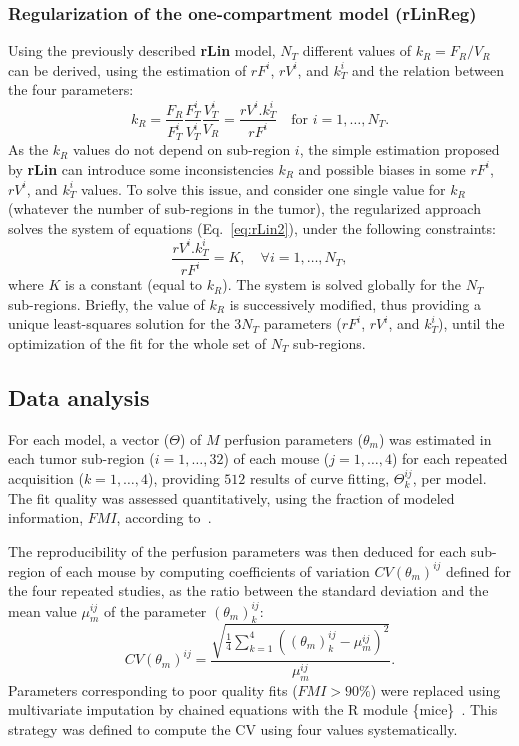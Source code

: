 \subsubsection{Regularization of the one-compartment model (\textbf{rLinReg})}
Using the previously described \textbf{rLin} model, $N_T$ different values of $k_R= F_R/V_R$ can be derived, using the estimation of $rF^i$, $rV^i$, and $k_T^i$ and the relation between the four parameters:
\begin{equation}
k_R = \frac{F_R}{F_T^i}\frac{F_T^i}{V_T^i}\frac{V_T^i}{V_R} = \frac{rV^i.k_T^i}{rF^i} \quad \text{for } i = 1,\ldots,N_T.
\end{equation}
As the $k_R$ values do not depend on sub-region $i$, the simple estimation proposed by \textbf{rLin} can introduce some inconsistencies $k_R$  and possible biases in some $rF^i$, $rV^i$, and $k_{T}^i$ values. To solve this issue,
and consider one single value for $k_R$ (whatever the number of sub-regions in the tumor), the regularized approach solves the system of equations  (Eq.~\ref{eq:rLin2}), under the following constraints:
\begin{equation}
\frac{rV^i.k_T^i}{rF^i} = K, \quad \forall i = 1,\ldots,N_T,
\end{equation}
where $K$ is a constant (equal to $k_R$).
The system is solved globally for the $N_T$ sub-regions. Briefly, the value of $k_R$ is successively modified, thus providing a unique least-squares solution for the $3N_T$ parameters ($rF^i$, $rV^i$, and $k_{T}^i$), until the optimization of the fit for the whole set of $N_T$ sub-regions.

\subsection{Data analysis}
For each model, a vector ($\Theta$) of $M$ perfusion parameters ($\theta_m$) was estimated in each tumor sub-region ($i=1,\ldots,32$) of each mouse ($j=1,\ldots,4$) for each repeated acquisition ($k=1,\ldots,4$), providing $512$ results of curve fitting, $\Theta^{ij}_k$, per model. 
The fit quality was assessed quantitatively, using the fraction of modeled information, $FMI$, according to~\cite{Balvay:2005ca}. 

The reproducibility of the perfusion parameters was then deduced for each sub-region of each mouse by computing coefficients of variation $CV(\theta_m)^{ij}$ defined for the four repeated studies, as the ratio between the standard deviation and the mean value $\mu_{m}^{ij}$ of the parameter $(\theta_{m})^{ij}_k$: 
\begin{equation}
{CV(\theta_m)^{ij}} = \frac {\sqrt {\frac{1}{4} {\sum _{k=1}^{4} ((\theta_{m})^{ij}_k- \mu_{m}^{ij})^2}}} {\mu_{m}^{ij}}.
\label{eq:CV}
\end{equation}
Parameters corresponding to poor quality fits ($FMI > 90\% $) were replaced using multivariate imputation by chained equations with the R module \{mice\}~\cite{vanBuuren:2011ica}. This strategy was defined to compute the CV using four values systematically.

